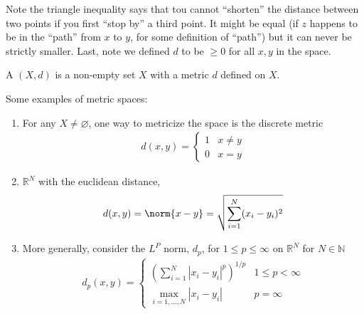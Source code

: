 \documentclass{article}
\begin{document}
Note the triangle inequality says that tou cannot ``shorten'' the distance between two points if you first ``stop by'' a third point. It might be equal (if $z$ happens to be in the ``path'' from $x$ to $y$, for some definition of ``path'') but it can never be strictly smaller. Last, note we defined $d$ to be $\ge 0$ for all $x, y$ in the space.

\begin{definition}\label{def:lecture1_space}
  A  $(X, d)$ is a non-empty set $X$ with a metric $d$ defined on $X$.
\end{definition}

Some examples of metric spaces:
\begin{enumerate}
  \item For any $X \ne \varnothing$, one way to metricize the space is the discrete metric
    \begin{align*}
      d(x, y) = \begin{cases}
        1 & x \ne y \\
        0 & x = y
      \end{cases}
    \end{align*}

  \item $\mathbb{R}^N$ with the euclidean distance,
    \begin{align*}
      d(x, y)
      = \norm{x - y}
      = \sqrt{\sum^{N}_{i = 1} (x_i - y_i)^2}
    \end{align*}

  \item More generally, consider the $L^P$ norm, $d_p$, for $1 \le p \le \infty$ on $\mathbb{R}^N$ for $N \in \mathbb{N}$
    \begin{align*}
      d_p(x, y)
      =
      \begin{cases}
        \left(\displaystyle\sum^{N}_{i = 1} |x_i - y_i|^p\right)^{1 / p}
          & 1 \le p < \infty \\[12pt]
        \displaystyle\max_{i = 1, \ldots, N} |x_i - y_i|
          & p = \infty
      \end{cases}
    \end{align*}


\end{enumerate}
\end{document}

